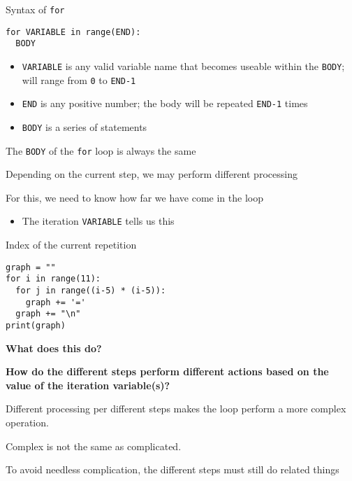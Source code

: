 \documentclass{beamer}
\begin{document}
\begin{frame}[fragile]{Syntax of \texttt{for}}
\begin{lstlisting}
for VARIABLE in range(END):
  BODY
\end{lstlisting}

\begin{itemize}
\item \texttt{VARIABLE} is any valid variable name that becomes useable within the \texttt{BODY}; will range from \texttt{0} to \texttt{END-1}
\item \texttt{END} is any positive number; the body will be repeated \texttt{END-1} times
\item \texttt{BODY} is a series of statements
\end{itemize}
\end{frame}


\begin{slide}{
\item The \texttt{BODY} of the \texttt{for} loop is always the same
\item Depending on the current step, we may perform different processing
\item For this, we need to know how far we have come in the loop
\begin{itemize}
\item The iteration \texttt{VARIABLE} tells us this
\end{itemize}
}\end{slide}

\begin{frame}[fragile]{Index of the current repetition}
\begin{lstlisting}
graph = ""
for i in range(11):
  for j in range((i-5) * (i-5)):
    graph += '='
  graph += "\n"
print(graph)
\end{lstlisting}

\textbf{What does this do?}

\textbf{How do the different steps perform different actions based on the value of the iteration variable(s)?}
\end{frame}

\begin{slide}{
\item Different processing per different steps makes the loop perform a more complex operation.
\item Complex is not the same as complicated.
\item To avoid needless complication, the different steps must still do related things
}\end{slide}
\end{document}
